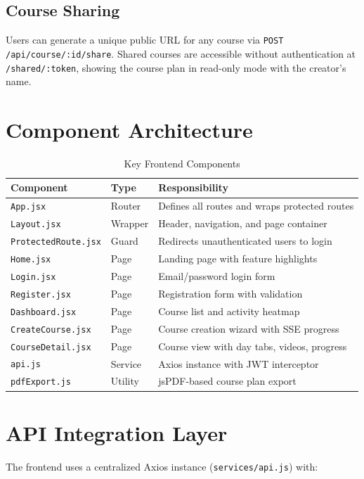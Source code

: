 \documentclass[12pt,a4paper]{report}
\begin{document}
\subsection{Course Sharing}
Users can generate a unique public URL for any course via \texttt{POST /api/course/:id/share}. Shared courses are accessible without authentication at \texttt{/shared/:token}, showing the course plan in read-only mode with the creator's name.

\section{Component Architecture}

\begin{table}[H]
\centering
\caption{Key Frontend Components}
\label{tab:components}
\begin{tabularx}{\textwidth}{l l X}
\toprule
\textbf{Component} & \textbf{Type} & \textbf{Responsibility} \\
\midrule
\texttt{App.jsx}           & Router    & Defines all routes and wraps protected routes \\
\texttt{Layout.jsx}        & Wrapper   & Header, navigation, and page container \\
\texttt{ProtectedRoute.jsx}& Guard     & Redirects unauthenticated users to login \\
\texttt{Home.jsx}          & Page      & Landing page with feature highlights \\
\texttt{Login.jsx}         & Page      & Email/password login form \\
\texttt{Register.jsx}      & Page      & Registration form with validation \\
\texttt{Dashboard.jsx}     & Page      & Course list and activity heatmap \\
\texttt{CreateCourse.jsx}  & Page      & Course creation wizard with SSE progress \\
\texttt{CourseDetail.jsx}  & Page      & Course view with day tabs, videos, progress \\
\texttt{api.js}            & Service   & Axios instance with JWT interceptor \\
\texttt{pdfExport.js}      & Utility   & jsPDF-based course plan export \\
\bottomrule
\end{tabularx}
\end{table}

\section{API Integration Layer}
The frontend uses a centralized Axios instance (\texttt{services/api.js}) with:
\end{document}
